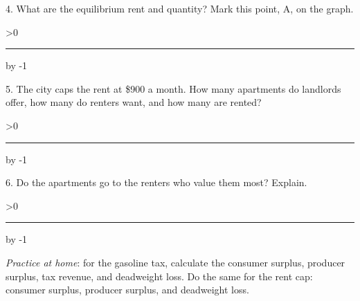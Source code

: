\documentclass[11pt]{article}
\newcommand{\answerlines}[1]{%
  \par\vspace{1pt}\answerlinecount=#1
  \loop\ifnum\answerlinecount>0
    \rule{\linewidth}{0.3pt}\par\vspace{5pt}%
    \advance\answerlinecount by -1
  \repeat
  \vspace{-5pt}}
\begin{document}
\vspace{4pt}
4. What are the equilibrium rent and quantity? Mark this point, A, on the graph.
\answerlines{1}

5. The city caps the rent at \$900 a month. How many apartments do landlords
offer, how many do renters want, and how many are rented?
\answerlines{2}

6. Do the apartments go to the renters who value them most? Explain.
\answerlines{2}

\vspace{10pt}
\emph{Practice at home}: for the gasoline tax, calculate the consumer surplus,
producer surplus, tax revenue, and deadweight loss. Do the same for the rent cap:
consumer surplus, producer surplus, and deadweight loss.
\end{document}
